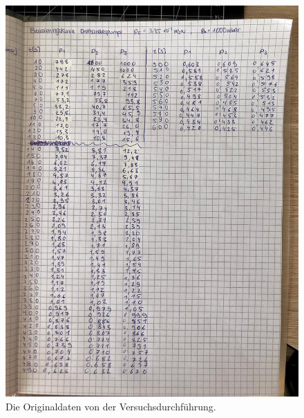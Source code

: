 \begin{figure}
    \includegraphics[width=\textwidth]{bilder/Anhang4.jpg}
    \caption{Die Originaldaten von der Versuchsdurchführung.}
    \label{fig:originaldaten}
\end{figure}